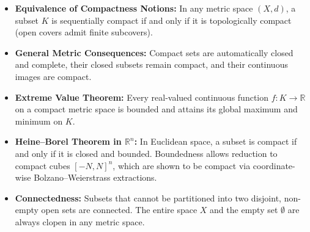 \begin{overview}
\begin{itemize}
    \item \textbf{Equivalence of Compactness Notions:} In any metric space $(X, d)$, a subset $K$ is sequentially compact if and only if it is topologically compact (open covers admit finite subcovers).
    \item \textbf{General Metric Consequences:} Compact sets are automatically closed and complete, their closed subsets remain compact, and their continuous images are compact.
    \item \textbf{Extreme Value Theorem:} Every real-valued continuous function $f \colon K \to \mathbb{R}$ on a compact metric space is bounded and attains its global maximum and minimum on $K$.
    \item \textbf{Heine--Borel Theorem in $\mathbb{R}^n$:} In Euclidean space, a subset is compact if and only if it is closed and bounded. Boundedness allows reduction to compact cubes $[-N, N]^n$, which are shown to be compact via coordinate-wise Bolzano--Weierstrass extractions.
    \item \textbf{Connectedness:} Subsets that cannot be partitioned into two disjoint, non-empty open sets are connected. The entire space $X$ and the empty set $\emptyset$ are always clopen in any metric space.
\end{itemize}
\end{overview}